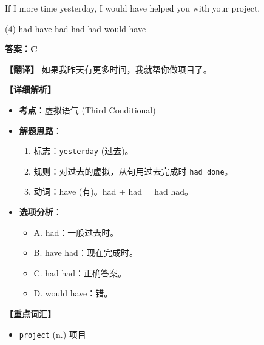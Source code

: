 \documentclass[11pt, a4paper]{article}
\newcommand{\analysis}[4]{
    \begin{solutionbox}
        \textbf{答案：#1}
        
        \textbf{【翻译】} #2
        
        \textbf{【详细解析】}
        #3
        
        \textbf{【重点词汇】}
        #4
    \end{solutionbox}
}
\newcommand{\blank}{\underline{\hspace{1.5cm}}}
\begin{document}
\begin{questions}
    \item If I \blank more time yesterday, I would have helped you with your project.
    \begin{tasks}(4)
        \task had \task have had \task had had \task would have
    \end{tasks}
    \analysis{C}{如果我昨天有更多时间，我就帮你做项目了。}{
        \begin{itemize}
            \item \textbf{考点}：虚拟语气 (Third Conditional)
            \item \textbf{解题思路}：
                \begin{enumerate}
                    \item 标志：\texttt{yesterday} (过去)。
                    \item 规则：对过去的虚拟，从句用过去完成时 \texttt{had done}。
                    \item 动词：have (有)。had + had = had had。
                \end{enumerate}
            \item \textbf{选项分析}：
                \begin{itemize}
                    \item A. had：一般过去时。
                    \item B. have had：现在完成时。
                    \item C. had had：正确答案。
                    \item D. would have：错。
                \end{itemize}
        \end{itemize}
    }{
        \begin{itemize}
            \item \texttt{project} (n.) 项目
        \end{itemize}
    }


\end{questions}
\end{document}

